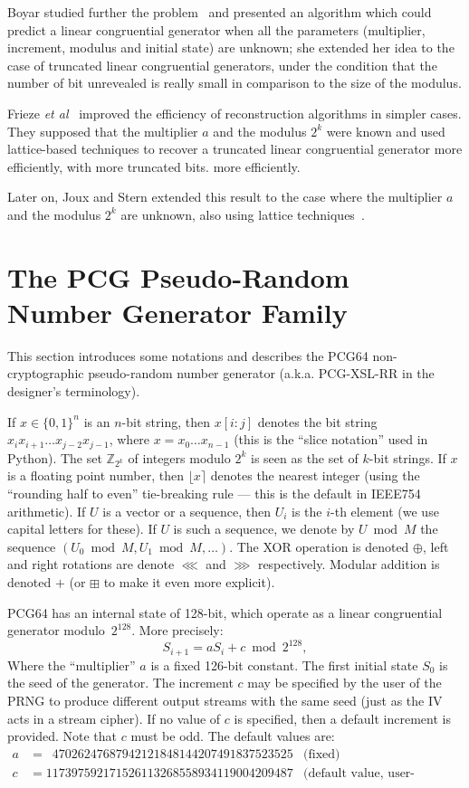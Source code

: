 \documentclass[submission,svgnames,journal=tosc]{iacrtrans}
\begin{document}
Boyar studied further the problem~\cite{Boyar1989} and presented an algorithm
which could predict a linear congruential generator when all the parameters
(multiplier, increment, modulus and initial state) are unknown; she extended her
idea to the case of truncated linear congruential generators, under the
condition that the number of bit unrevealed is really small in comparison to the
size of the modulus.

Frieze \textit{et al}~\cite{Frieze} improved the efficiency of reconstruction
algorithms in simpler cases. They supposed that the multiplier $a$ and the
modulus $2^k$ were known and used lattice-based techniques to recover a
truncated linear congruential generator more efficiently, with more truncated
bits.  more efficiently.

Later on, Joux and Stern extended this result to the case where the multiplier
$a$ and the modulus $2^k$ are unknown, also using lattice
techniques~\cite{JouxS98}.

\section{The PCG Pseudo-Random Number Generator Family}

This section introduces some notations and describes the \textsf{PCG64}
non-cryptographic pseudo-random number generator (a.k.a. \textsf{PCG-XSL-RR} in
the designer's terminology).

If $x \in \{0, 1\}^n$ is an $n$-bit string, then $x[i:j]$ denotes the bit string
$x_ix_{i+1}\dots x_{j-2}x_{j-1}$, where $x = x_0\dots x_{n-1}$ (this is the
``slice notation'' used in \textsf{Python}). The set $\mathbb{Z}_{2^k}$ of
integers modulo $2^k$ is seen as the set of $k$-bit strings. If $x$ is a
floating point number, then $\lfloor x \rceil$ denotes the nearest integer
(using the ``rounding half to even'' tie-breaking rule --- this is the default
in IEEE754 arithmetic). If $U$ is a vector or a sequence, then $U_i$ is the
$i$-th element (we use capital letters for these). If $U$ is such a sequence, we
denote by $U \bmod M$ the sequence $(U_0 \bmod M, U_1 \bmod M, \dots)$. The XOR
operation is denoted $\oplus$, left and right rotations are denote $\lll$ and
$\ggg$ respectively. Modular addition is denoted $+$ (or $\boxplus$ to make it
even more explicit).

\textsf{PCG64} has an internal state of 128-bit, which operate as a linear
congruential generator modulo~$2^{128}$. More precisely:
\[
  S_{i+1} = a S_i + c \bmod 2^{128},
\]
Where the ``multiplier'' $a$ is a fixed 126-bit constant. The first initial state $S_0$ is the seed of
the generator. The increment $c$ may be specified by the user of the PRNG to
produce different output streams with the same seed (just as the IV acts in a
stream cipher). If no value of $c$ is specified, then a default increment is
provided. Note that $c$ must be odd. The default values are:
\begin{align*}
  a &= \phantom{1}47026247687942121848144207491837523525 & \text{(fixed)}\\
  c &= 117397592171526113268558934119004209487           & \text{(default value, user-definable)}
\end{align*}
\end{document}
